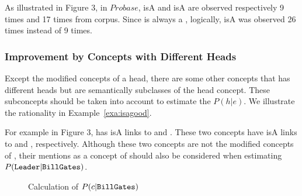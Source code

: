 {\footnotesize
\begin{example}
\label{exa:clc}
As illustrated in Figure 3,
in $Probase$,  isA   and  isA  are observed respectively 9 times and 17 times from corpus. Since  is always a ,  logically,  isA  was observed 26 times instead of 9 times.
\end{example}
}

\subsubsection{Improvement by Concepts with Different Heads}
Except the modified concepts of a head, there are some other concepts that has different heads but  are semantically subclasses of the head concept. These subconcepts should be taken into account to estimate the ${P}(h|e)$.  We illustrate the rationality in Example~\ref{exa:isagood}.

{\footnotesize
\begin{example}
\label{exa:isagood}
For example in Figure 3,
 has isA links to  and . 
These two concepts have isA links to  and , respectively. 
Although these two concepts are not the modified concepts of , their mentions as a concept of   should also be considered when estimating $P(\at{Leader}|\at{Bill Gates})$.
\end{example}
}

\begin{figure}[!tb]
\vspace{-2mm}
\label{fig:bill}
\centering
{}%
\vspace{-4mm}
\caption{Calculation of $P({c}|{\tt Bill Gates})$ }
\vspace{-3mm}
\end{figure}

